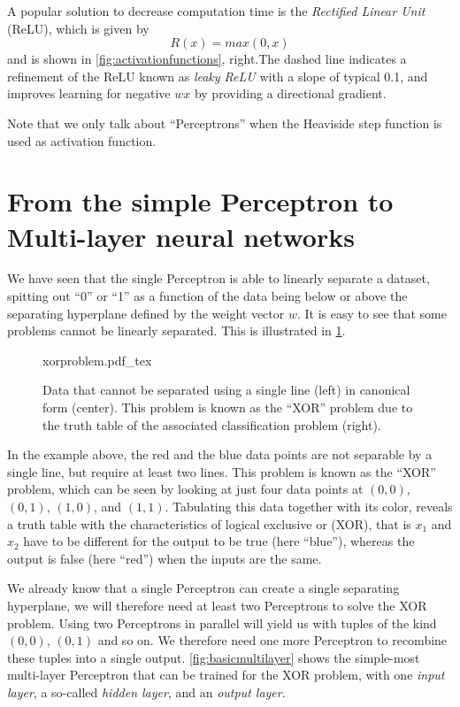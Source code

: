 A popular solution to decrease computation time is the \textsl{Rectified Linear Unit} (ReLU), which is given by
\begin{equation}
R(x)=max(0,x)
\end{equation}
and is shown in \cref{fig:activationfunctions}, right.The dashed line indicates a refinement of the ReLU known as \textsl{leaky ReLU} with a slope of typical 0.1, and improves learning for negative $wx$ by providing a directional gradient.

Note that we only talk about ``Perceptrons'' when the Heaviside step function is used as activation function.

\section{From the simple Perceptron to Multi-layer neural networks}

We have seen that the single Perceptron is able to linearly separate a dataset, spitting out ``0'' or ``1'' as a function of the data being below or above the separating hyperplane defined by the weight vector $w$. It is easy to see that some problems cannot be linearly separated. This is illustrated in \cref{fig:xorproblem}.

\begin{figure}[htb]
    \centering
    \def\svgwidth{0.9\textwidth}
    {xorproblem.pdf_tex}
    \caption{Data that cannot be separated using a single line (left) in canonical form (center). This problem is known as the ``XOR'' problem due to the truth table of the associated classification problem (right).\label{fig:xorproblem}}
\end{figure}

In the example above, the red and the blue data points are not separable by a single line, but require at least two lines. This problem is known as the ``XOR'' problem, which can be seen by looking at just four data points at $(0,0)$, $(0,1)$, $(1,0)$, and $(1,1)$. Tabulating this data together with its color, reveals a truth table with the characteristics of logical exclusive or (XOR), that is $x_1$ and $x_2$ have to be different for the output to be true (here ``blue''), whereas the output is false (here ``red'') when the inputs are the same.

We already know that a single Perceptron can create a single separating hyperplane, we will therefore need at least two Perceptrons to solve the XOR problem. Using two Perceptrons in parallel will yield us with tuples of the kind $(0,0)$, $(0,1)$ and so on. We therefore need one more Perceptron to recombine these tuples into a single output. \cref{fig:basicmultilayer}
shows the simple-most multi-layer Perceptron that can be trained for the XOR problem, with one \textsl{input layer}, a so-called \textsl{hidden layer}, and an \textsl{output layer}.

